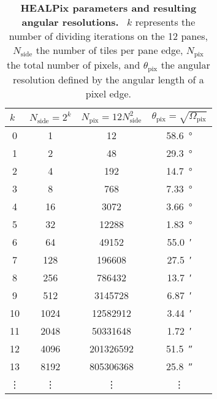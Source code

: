 \begin{table}[H]
\centering
\begin{tabular}{S[table-format=2.0]|S[table-format=4.0]|S[table-format=9.0]|S[table-format=2.2]}
\toprule
{} &  &  &  \\
  & 1    & 12        &  \SI{58.6}{\degree}\\
1  & 2    & 48        &  \SI{29.3}{\degree}\\
2  & 4    & 192       &  \SI{14.7}{\degree}\\
3  & 8    & 768 	  &  \SI{7.33}{\degree}\\
4  & 16   & 3072      &  \SI{3.66}{\degree}\\
5  & 32   & 12288     &  \SI{1.83}{\degree}\\
6  & 64   & 49152     &  \SI{55.0}{\arcminute}\\
7  & 128  & 196608    &  \SI{27.5}{\arcminute}\\
8  & 256  & 786432    &  \SI{13.7}{\arcminute}\\
9  & 512  & 3145728   &  \SI{6.87}{\arcminute}\\
10 & 1024 & 12582912  &  \SI{3.44}{\arcminute}\\
11 & 2048 & 50331648  &  \SI{1.72}{\arcminute}\\
12 & 4096 & 201326592 &  \SI{51.5}{\arcsecond}\\
13 & 8192 & 805306368 &  \SI{25.8}{\arcsecond}\\
 &  &  &  \\
\bottomrule
\end{tabular}
\caption[HEALPix parameters and resulting angular resolutions]{\textbf{HEALPix parameters and resulting angular resolutions.}~\cite{healpix:paper} $k$ represents the number of dividing iterations on the 12 panes, $N_\text{side}$ the number of tiles per pane edge, $N_\text{pix}$ the total number of pixels, and $\theta_\text{pix}$ the angular resolution defined by the angular length of a pixel edge.}
\label{healpix:table}
\end{table}

